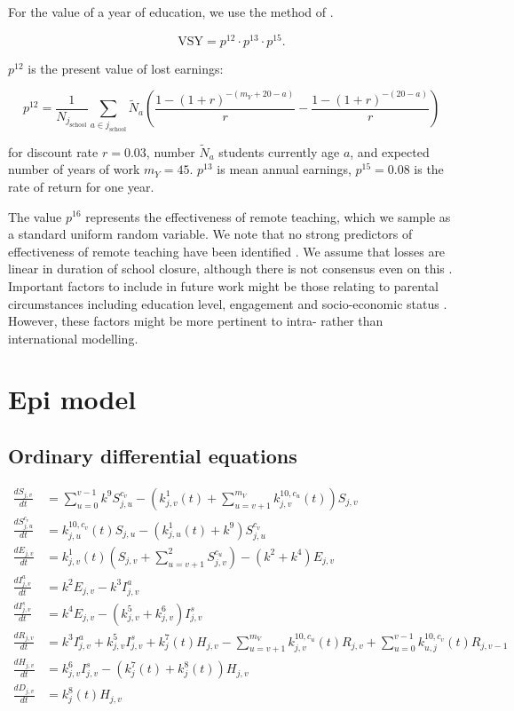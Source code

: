\documentclass[
]{article}
\begin{document}
For the value of a year of education, we use the method of \citep{Psacharopoulos2021a}.

\[\text{VSY} =  p^{12}\cdot p^{13}\cdot p^{15}.\]

\(p^{12}\) is the present value of lost earnings:

\[p^{12} = \frac{1}{N_{j_{\text{school}}}}\sum_{a\in j_{\text{school}}}\tilde{N}_a\left( \frac{1-(1+r)^{-(m_Y+20-a)}}{r} -  \frac{1-(1+r)^{-(20-a)}}{r}\right)\]

for discount rate \(r=0.03\), number \(\tilde{N}_a\) students currently age \(a\), and expected number of years of work \(m_Y=45\). \(p^{13}\) is mean annual earnings, \(p^{15}=0.08\) is the rate of return for one year.

The value \(p^{16}\) represents the effectiveness of remote teaching, which we sample as a standard uniform random variable. We note that no strong predictors of effectiveness of remote teaching have been identified \citep{Patrinos2023}. We assume that losses are linear in duration of school closure, although there is not consensus even on this \citep{Betthauser2023}. Important factors to include in future work might be those relating to parental circumstances including education level, engagement and socio-economic status \citep{Moscoviz2022}. However, these factors might be more pertinent to intra- rather than international modelling.

\section{Epi model}\label{epi-model}

\subsection{Ordinary differential equations}\label{ordinary-differential-equations}

\begin{align}
\frac{dS_{j,v}}{dt} & = \sum_{u=0}^{v-1}k^9S_{j,u}^{c_v} - \left( k_{j,v}^{1}(t) + \sum_{u=v+1}^{{m_V}}k_{j,v}^{10,c_u}(t) \right)S_{j,v} \\
\frac{dS_{j,u}^{c_v}}{dt} & = k_{j,u}^{10,c_v}(t)S_{j,u} -\left( k_{j,u}^{1}(t) + k^9 \right)S_{j,u}^{c_v}  \\
\frac{dE_{j,v}}{dt} & = k_{j,v}^{1}(t)\left(S_{j,v}+\sum_{u=v+1}^2S_{j,v}^{c_u}\right) - (k^2+k^4)E_{j,v} \\
\frac{dI_{j,v}^a}{dt} & = k^2E_{j,v} - k^3I_{j,v}^a \\
\frac{dI_{j,v}^s}{dt} & = k^4E_{j,v} - (k_{j,v}^{5}+k_{j,v}^{6})I_{j,v}^s \\
\frac{dR_{j,v}}{dt} & = k^3I_{j,v}^a + k_{j,v}^{5}I_{j,v}^s + k_{j}^{7}(t) H_{j,v} - \sum_{u=v+1}^{{m_V}}k_{j,v}^{10,c_u}(t)R_{j,v} + \sum_{u=0}^{v-1}k_{u,j}^{10,c_v}(t)R_{j,v-1}\\
\frac{dH_{j,v}}{dt} & = k_{j,v}^{6}I_{j,v}^s - (k_{j}^{7}(t) + k_{j}^{8}(t)) H_{j,v} \\
\frac{dD_{j,v}}{dt} & =  k_{j}^{8}(t) H_{j,v}
\end{align}
\end{document}
